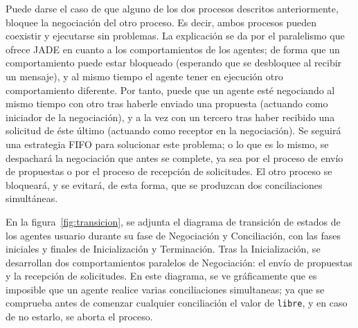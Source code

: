 Puede darse el caso de que alguno de los dos procesos descritos anteriormente, bloquee la negociación del otro proceso. Es decir, ambos procesos pueden coexistir y ejecutarse sin problemas. La explicación se da por el paralelismo que ofrece JADE en cuanto a los comportamientos de los agentes; de forma que un comportamiento puede estar bloqueado (esperando que se desbloquee al recibir un mensaje), y al mismo tiempo el agente tener en ejecución otro comportamiento diferente. Por tanto, puede que un agente esté negociando al mismo tiempo con otro tras haberle enviado una propuesta (actuando como iniciador de la negociación), y a la vez con un tercero tras haber recibido una solicitud de éste último (actuando como receptor en la negociación). Se seguirá una estrategia FIFO para solucionar este problema; o lo que es lo mismo, se despachará la negociación que antes se complete, ya sea por el proceso de envío de propuestas o por el proceso de recepción de solicitudes. El otro proceso se bloqueará, y se evitará, de esta forma, que se produzcan dos conciliaciones simultáneas.

En la figura~\ref{fig:transicion}, se adjunta el diagrama de transición de estados de los agentes usuario durante su fase de Negociación y Conciliación, con las fases iniciales y finales de Inicialización y Terminación. Tras la Inicialización, se desarrollan dos comportamientos paralelos de Negociación: el envío de propuestas y la recepción de solicitudes. En este diagrama, se ve gráficamente que es imposible que un agente realice varias conciliaciones simultaneas; ya que se comprueba antes de comenzar cualquier conciliación el valor de {\tt libre}, y en caso de no estarlo, se aborta el proceso.

